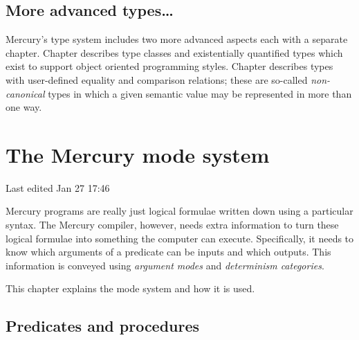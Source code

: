 \documentclass[a4paper,11pt,notitlepage,onecolumn]{book}
\begin{document}
\section{More advanced types\ldots}

Mercury's type system includes two more advanced aspects each with a
separate chapter.  Chapter \XXX{} describes type classes and existentially
quantified types which exist to support object oriented programming styles.
Chapter \XXX{} describes types with user-defined equality and comparison
relations; these are so-called \emph{non-canonical} types in which a given
semantic value may be represented in more than one way.



\setcounter{chapter}{2}



\chapter{The Mercury mode system}

Last edited Jan 27 17:46

Mercury programs are really just logical formulae written down using a
particular syntax.  The Mercury compiler, however, needs extra information
to turn these logical formulae into something the computer can execute.
Specifically, it needs to know which arguments of a predicate 
can be inputs and which outputs.  This information is conveyed using
\emph{argument modes} and \emph{determinism categories}.

This chapter explains the mode system and how it is used.

\section{Predicates and procedures}
\end{document}
